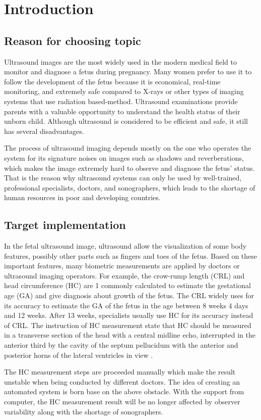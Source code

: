 \chapter{Introduction}
\section{Reason for choosing topic}
\label{section:reason_topic}
\noindent
	
	Ultrasound images are the most widely used in the modern medical field to monitor and diagnose a fetus during pregnancy. Many women prefer to use it to follow the development of the fetus because it is economical, real-time monitoring, and extremely safe compared to X-rays or other types of imaging systems that use radiation based-method. Ultrasound examinations provide parents with a valuable opportunity to understand the health status of their unborn child. Although ultrasound is considered to be efficient and safe, it still has several disadvantages.
	
	The process of ultrasound imaging depends mostly on the one who operates the system for its signature noises on images such as shadows and reverberations, which makes the image extremely hard to observe and diagnose the fetus’ status. That is the reason why ultrasound systems can only be used by well-trained, professional specialists, doctors, and sonographers, which leads to the shortage of human resources in poor and developing countries.
	
\section{Target implementation}
\label{section:target_implementation}
\noindent
	
	In the fetal ultrasound image, ultrasound allow the visualization of some body features, possibly other parts such as fingers and toes of the fetus. Based on these important features, many biometric measurements are applied by doctors or ultrasound imaging operators. For example, the crow-rump length (CRL) and head circumference (HC) are 1 commonly calculated to estimate the gestational age (GA) and give diagnosis about growth of the fetus. The CRL widely uses for its accuracy to estimate the GA of the fetus in the age between 8 weeks 4 days and 12 weeks. After 13 weeks, specialists usually use HC for its accuracy instead of CRL. The instruction of HC measurement state that HC should be measured in a transverse section of the head with a central midline echo, interrupted in the anterior third by the cavity of the septum pellucidum with the anterior and posterior horns of the lateral ventricles in view \cite{thomas}. 
	
	The HC measurement steps are proceeded manually which make the result unstable when being conducted by different doctors. The idea of creating an automated system is born base on the above obstacle. With the support from computer, the HC measurement result will be no longer affected by observer variability along with the shortage of sonographers.

    
    